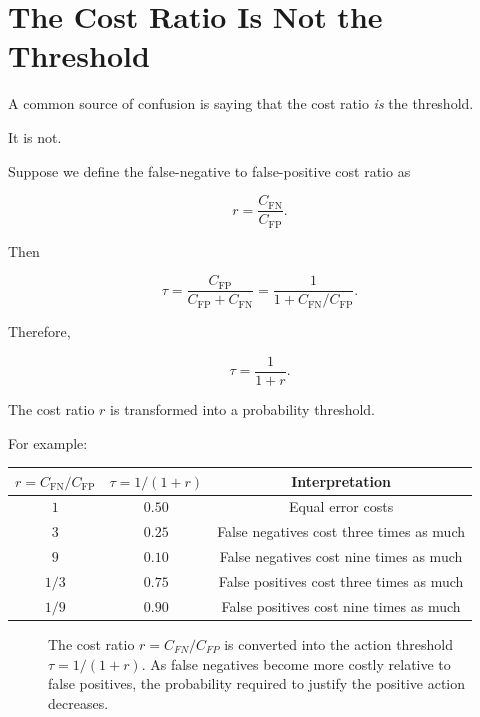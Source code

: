 \documentclass[11pt]{article}
\newcommand{\CFP}{C_{\mathrm{FP}}}
\newcommand{\CFN}{C_{\mathrm{FN}}}
\begin{document}
\section{The Cost Ratio Is Not the Threshold}

A common source of confusion is saying that the cost ratio \emph{is} the threshold.

It is not.

Suppose we define the false-negative to false-positive cost ratio as

\[
r
=
\frac{\CFN}{\CFP}.
\]

Then

\[
\tau
=
\frac{\CFP}{\CFP+\CFN}
=
\frac{1}{1+\CFN/\CFP}.
\]

Therefore,

\[
\boxed{
\tau=\frac{1}{1+r}.
}
\]

The cost ratio $r$ is transformed into a probability threshold.

For example:

\begin{center}
\begin{tabular}{ccc}
\toprule
$r=\CFN/\CFP$ & $\tau=1/(1+r)$ & Interpretation \\
\midrule
$1$ & $0.50$ & Equal error costs \\
$3$ & $0.25$ & False negatives cost three times as much \\
$9$ & $0.10$ & False negatives cost nine times as much \\
$1/3$ & $0.75$ & False positives cost three times as much \\
$1/9$ & $0.90$ & False positives cost nine times as much \\
\bottomrule
\end{tabular}
\end{center}

\begin{figure}[H]
\centering
{}
\caption{The cost ratio $r=C_{FN}/C_{FP}$ is converted into the action threshold $\tau=1/(1+r)$. As false negatives become more costly relative to false positives, the probability required to justify the positive action decreases.}
\label{fig:cost-ratio-threshold}
\end{figure}
\end{document}
